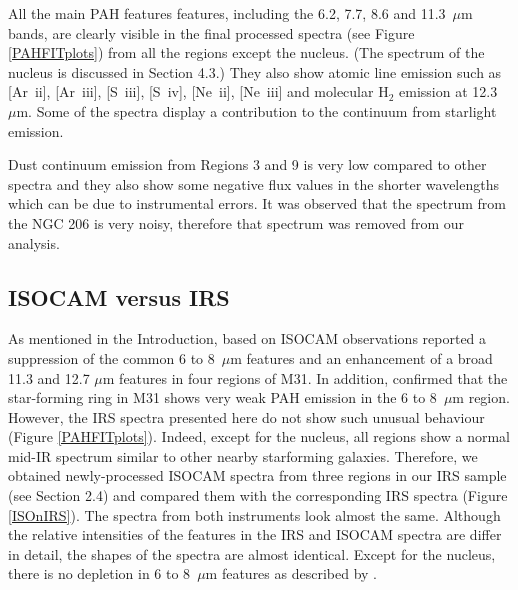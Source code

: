 



All the main PAH features features, including the 6.2, 7.7, 8.6 and 11.3~$\mu$m bands, are clearly visible in the final processed spectra 
(see Figure \ref{PAHFITplots}) from all the regions except the nucleus. (The spectrum of the nucleus is discussed in Section 4.3.)
They also show atomic line emission such as [Ar~{\sc ii}], [Ar~{\sc iii}], [S~{\sc iii}], [S~{\sc iv}], [Ne~{\sc ii}], [Ne~{\sc iii}] 
and molecular H$_{2}$ emission at 12.3~$\mu$m. Some of the spectra display a contribution to the continuum from starlight emission.


Dust continuum emission from Regions 3 and 9 is very low compared to other spectra and they also show some negative flux values in the shorter 
wavelengths which can be due to instrumental errors. It was observed that the spectrum from the NGC 206 is very noisy, therefore that spectrum 
was removed from our analysis. 


\subsection{ISOCAM versus IRS}
\label{sect:iso_vs_irs}

%
As mentioned in the Introduction, based on ISOCAM observations \citet{1998Cesarsky} reported a suppression of the common 
6 to 8~$\mu$m features and an enhancement of a broad 11.3 and 12.7 $\mu$m features in four regions of M31. 
In addition, \citet{Pagani_1999} confirmed that the star-forming ring in M31 shows very weak PAH emission in the 6 to 8~$\mu$m region. 
However, the IRS spectra presented here do not show such unusual behaviour (Figure \ref{PAHFITplots}). 
Indeed, except for the nucleus, all regions show a normal mid-IR spectrum similar to other nearby starforming galaxies. 
Therefore, we obtained newly-processed ISOCAM spectra from three regions in our IRS sample (see Section 2.4) %
and compared them with the corresponding IRS spectra (Figure \ref{ISOnIRS}). 
The spectra from both instruments look almost the same. Although the relative intensities of the features in the IRS and ISOCAM 
spectra are differ in detail, the shapes of the spectra are almost identical. Except for the nucleus, there is no depletion in 
6 to 8~$\mu$m features as described by \citet{1998Cesarsky}. 

